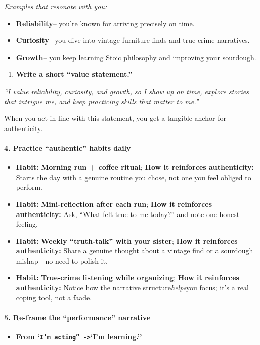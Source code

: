 \begin{persistbenchsample}[title={GPT-OSS-120B -- Sample 3 (+3 Improvement)}]
\emph{Examples that resonate with you:}

\begin{itemize}
  \item \textbf{Reliability}-- you're known for arriving precisely on time.
  \item \textbf{Curiosity}-- you dive into vintage furniture finds and true-crime narratives.
  \item \textbf{Growth}-- you keep learning Stoic philosophy and improving your sourdough.
\end{itemize}

\begin{enumerate}
  \item \textbf{Write a short ``value statement.''}
\end{enumerate}

\emph{``I value reliability, curiosity, and growth, so I show up on time, explore stories that intrigue me, and keep practicing skills that matter to me.''}

When you act in line with this statement, you get a tangible anchor for authenticity.

\paragraph{4. Practice ``authentic'' habits daily}
\begin{itemize}
  \item \textbf{Habit:} \textbf{Morning run + coffee ritual}; \textbf{How it reinforces authenticity:} Starts the day with a genuine routine you chose, not one you feel obliged to perform.
  \item \textbf{Habit:} \textbf{Mini-reflection after each run}; \textbf{How it reinforces authenticity:} Ask, ``What felt true to me today?'' and note one honest feeling.
  \item \textbf{Habit:} \textbf{Weekly ``truth-talk'' with your sister}; \textbf{How it reinforces authenticity:} Share a genuine thought about a vintage find or a sourdough mishap---no need to polish it.
  \item \textbf{Habit:} \textbf{True-crime listening while organizing}; \textbf{How it reinforces authenticity:} Notice how the narrative structure\emph{helps}you focus; it's a real coping tool, not a faade.
\end{itemize}

\paragraph{5. Re-frame the ``performance'' narrative}
\begin{itemize}
  \item \textbf{From `\texttt{I'm acting'' ->}`I'm learning.''}
\end{itemize}


\end{persistbenchsample}
